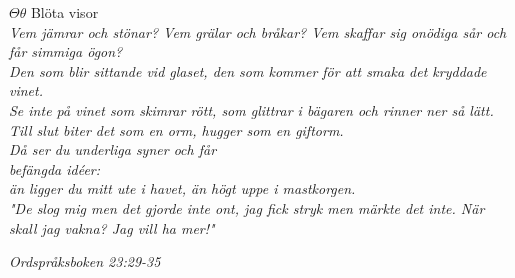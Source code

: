 \documentclass[a6paper,10pt]{article}
\begin{document}
\noindent
\huge{$\Theta\theta$ Blöta visor}\\
\newline
\large\textit{\indent Vem jämrar och stönar? Vem grälar och bråkar? Vem skaffar sig onödiga sår och får simmiga ögon? \\
\indent Den som blir sittande vid glaset, den som kommer för att smaka det kryddade vinet. \\
\indent Se inte på vinet som skimrar rött, som glittrar i bägaren
och rinner ner så lätt.\\
\indent Till slut biter det som en orm,
hugger som en giftorm. \\
\indent Då ser du underliga syner och får \\befängda idéer:\\
\indent än ligger du mitt ute i havet, än högt uppe i mastkorgen.\\
\indent "De slog mig men det gjorde inte ont,
jag fick stryk men märkte det inte.
När skall jag vakna?
Jag vill ha mer!"}
\begin{flushright}
\textit{Ordspråksboken 23:29-35}
\end{flushright}
\end{document}
